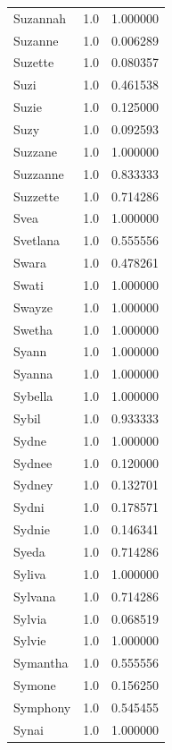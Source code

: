 \documentclass[
  letterpaper,
  DIV=11,
  numbers=noendperiod]{scrreprt}
\begin{document}
\begin{tabular}{lrr}
Suzannah        &   1.0 &   1.000000 \\
Suzanne         &   1.0 &   0.006289 \\
Suzette         &   1.0 &   0.080357 \\
Suzi            &   1.0 &   0.461538 \\
Suzie           &   1.0 &   0.125000 \\
Suzy            &   1.0 &   0.092593 \\
Suzzane         &   1.0 &   1.000000 \\
Suzzanne        &   1.0 &   0.833333 \\
Suzzette        &   1.0 &   0.714286 \\
Svea            &   1.0 &   1.000000 \\
Svetlana        &   1.0 &   0.555556 \\
Swara           &   1.0 &   0.478261 \\
Swati           &   1.0 &   1.000000 \\
Swayze          &   1.0 &   1.000000 \\
Swetha          &   1.0 &   1.000000 \\
Syann           &   1.0 &   1.000000 \\
Syanna          &   1.0 &   1.000000 \\
Sybella         &   1.0 &   1.000000 \\
Sybil           &   1.0 &   0.933333 \\
Sydne           &   1.0 &   1.000000 \\
Sydnee          &   1.0 &   0.120000 \\
Sydney          &   1.0 &   0.132701 \\
Sydni           &   1.0 &   0.178571 \\
Sydnie          &   1.0 &   0.146341 \\
Syeda           &   1.0 &   0.714286 \\
Syliva          &   1.0 &   1.000000 \\
Sylvana         &   1.0 &   0.714286 \\
Sylvia          &   1.0 &   0.068519 \\
Sylvie          &   1.0 &   1.000000 \\
Symantha        &   1.0 &   0.555556 \\
Symone          &   1.0 &   0.156250 \\
Symphony        &   1.0 &   0.545455 \\
Synai           &   1.0 &   1.000000 \\

\end{tabular}
\end{document}
